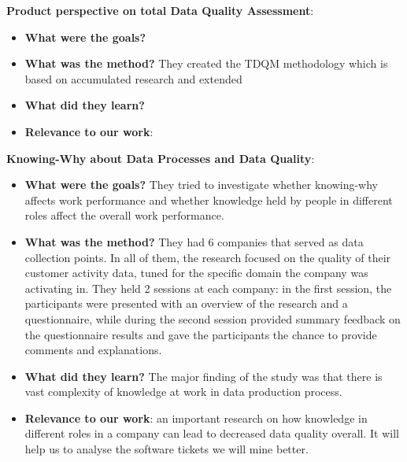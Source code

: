 \documentclass{mprop}
\begin{document}
\textbf{Product perspective on total 
        Data Quality Assessment}\cite{wang1998product}:
\begin{itemize}
  \item \textbf{What were the goals?}
    
  \item \textbf{What was the method?}
    They created the TDQM methodology which is based on accumulated research 
    and extended 
  \item \textbf{What did they learn?}
  \item \textbf{Relevance to our work}:
\end{itemize}

\textbf{Knowing-Why about Data Processes and Data Quality}\cite{lee2003knowing}:
\begin{itemize}
  \item \textbf{What were the goals?}
    They tried to investigate whether knowing-why affects work performance and
    whether knowledge held by people in different roles affect the overall work
    performance. 
  \item \textbf{What was the method?}
    They had 6 companies that served as data collection points. In all of them,
    the research focused on the quality of their customer activity data, tuned
    for the specific domain the company was activating in. They held 2 sessions
    at each company: in the first session, the participants were presented with
    an overview of the research and a questionnaire, while during the second 
    session provided summary feedback on the questionnaire results and gave the
    participants the chance to provide comments and explanations.
  \item \textbf{What did they learn?}
    The major finding of the study was that there is vast complexity of knowledge
    at work in data production process. 
  \item \textbf{Relevance to our work}: an important research on how knowledge in
    different roles in a company can lead to decreased data quality overall. It
    will help us to analyse the software tickets we will mine better.
\end{itemize}
\end{document}
